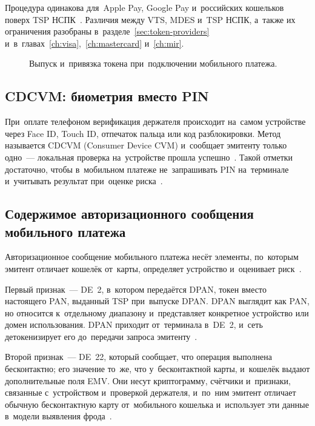 Процедура одинакова для~Apple Pay, Google Pay и~российских кошельков поверх TSP
НСПК~\cite{apple-card-provisioning-security,google-pay-device-tokenization-overview}.
Различия между VTS, MDES и~TSP НСПК, а~также их ограничения
разобраны в~разделе~\ref{sec:token-providers}
и~в~главах~\ref{ch:visa},~\ref{ch:mastercard} и~\ref{ch:mir}.

\begin{figure}[htbp]
  \centering
  \caption{Выпуск и~привязка токена при~подключении мобильного платежа.}\label{fig:contactless-provisioning}
\end{figure}

\subsection*{CDCVM: биометрия вместо PIN}

При~оплате телефоном верификация держателя происходит на~самом устройстве через
Face ID, Touch ID, отпечаток пальца или код разблокировки. Метод называется
CDCVM (Consumer Device CVM) и~сообщает эмитенту только одно~--- локальная
проверка на~устройстве прошла успешно~\cite{emvco-contactless-book-a}. Такой
отметки достаточно, чтобы в~мобильном платеже не~запрашивать PIN на~терминале
и~учитывать результат при~оценке
риска~\cite{visa-tadg,google-pay-device-tokenization-security}.

\subsection*{Содержимое авторизационного сообщения мобильного платежа}

Авторизационное сообщение мобильного платежа несёт элементы, по~которым
эмитент отличает кошелёк от~карты, определяет устройство и~оценивает риск~\cite{emvco-payment-tokenisation,visa-tadg}.

Первый признак~--- DE~2, в~котором передаётся DPAN, токен вместо настоящего
PAN, выданный TSP при~выпуске DPAN. DPAN выглядит как PAN, но относится
к~отдельному диапазону и~представляет конкретное устройство или домен
использования. DPAN приходит от~терминала в~DE~2, и~сеть детокенизирует его
до~передачи запроса эмитенту~\cite{emvco-payment-tokenisation}.

Второй признак~--- DE~22, который сообщает, что операция выполнена
бесконтактно; его значение то~же, что у~бесконтактной карты, и~кошелёк
выдают дополнительные поля EMV. Они несут криптограмму, счётчики
и~признаки, связанные с~устройством и~проверкой держателя, и~по~ним эмитент
отличает обычную бесконтактную карту от~мобильного кошелька и~использует эти
данные в~модели выявления фрода~\cite{visa-tadg,mc-tpr}.

